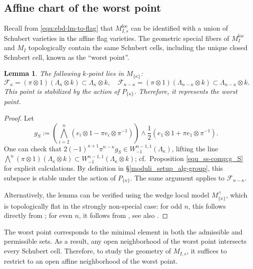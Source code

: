\documentclass[pdflatex,sn-mathphys-num]{sn-jnl}%
\theoremstyle{thmstyleone}%
\newtheorem{lemma}[subsubsection]{Lemma}%
\theoremstyle{thmstyletwo}%
\numberwithin{equation}{subsection}
\theoremstyle{thmstylethree}%
\newcommand{\CF}{\ensuremath{\mathcal{F}}\xspace}
\newcommand{\loc}{\ensuremath{\mathrm{loc}}\xspace}
\begin{document}
\subsection{Affine chart of the worst point}\label{equ_chart}
Recall from \eqref{equ:ebd-lm-to-flag} that $M_{I,s}^\loc$ can be identified with a union of Schubert varieties in the affine flag varieties. The geometric special fibers of $M^\loc_I$ and $M_I$ topologically contain the same Schubert cells, including the unique closed Schubert cell, known as the ``worst point''.
\begin{lemma}\label{equ_chart:wp}
    The following $k$-point lies in $M_{\{\kappa\}}$:
\begin{equation*}
	\CF_\kappa=(\pi\otimes 1)(\Lambda_\kappa\otimes k)\subset \Lambda_\kappa\otimes k,\quad
	\CF_{n-\kappa}=(\pi\otimes 1)(\Lambda_{n-\kappa}\otimes k)\subset \Lambda_{n-\kappa}\otimes k.
\end{equation*}
This point is stabilized by the action of $P_{\{\kappa\}}$. Therefore, it represents the worst point.
\end{lemma}
\begin{proof}
Let 
\begin{equation*}
g_S:=\left(\bigwedge_{i=2}^n (e_i\otimes 1-\pi e_i\otimes \pi^{-1})\right) \wedge \frac{1}{2}(e_1\otimes 1+\pi e_1\otimes \pi^{-1}).
\end{equation*}
One can check that $2(-1)^{\kappa+1}\pi^{n-\kappa}g_S\in W_{-1}^{n-1,1}(\Lambda_\kappa)$, lifting the line $\bigwedge^n (\pi\otimes 1)(\Lambda_\kappa\otimes k)\subset W_{-1}^{n-1,1}(\Lambda_\kappa\otimes k)$; cf.\ Proposition \ref{equ_ss-comp:g_S} for explicit calculations. 
By definition in \S \ref{moduli_setup_alg-group}, this subspace is stable under the action  of $P_{\{\kappa\}}$. The same argument applies to $\CF_{n-\kappa}$.

Alternatively, the lemma can be verified using the wedge local model $M_{\{\kappa\}}^\wedge$, which is topologically flat in the strongly non-special case: for odd $n$, this follows directly from \cite{Smithling2011}; for even $n$, it follows from \cite[Proposition 7.4.7]{Smithling2014}, see also \cite[Proposition 3.4]{HLS-basic}.
\end{proof}

The worst point corresponds to the minimal element in both the admissible and permissible sets. As a result, any open neighborhood of the worst point intersects every Schubert cell. Therefore, to study the geometry of $M_{I,s}$, it suffices to restrict to an open affine neighborhood of the worst point.
\end{document}
